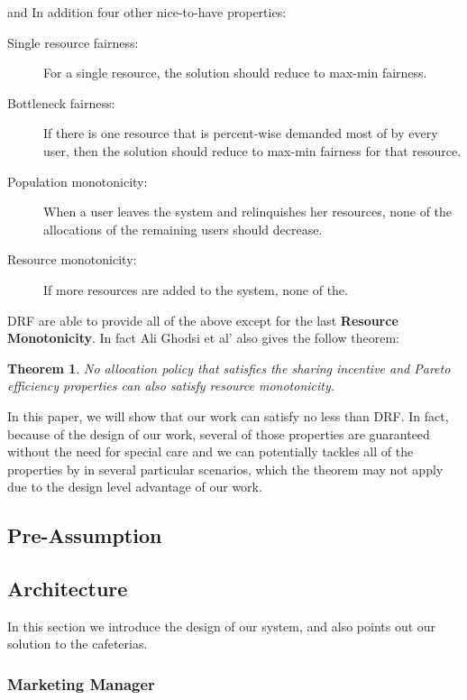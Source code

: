 \documentclass[a4paper,11pt,twocolumn]{article}
\begin{document}
and In addition  four
other nice-to-have properties:

\begin{description}

\item 
[Single resource fairness:] 
For a single resource, the
solution should reduce to max-min fairness.
\item 
[Bottleneck fairness:]
 If there is one resource that is
percent-wise demanded most of by every user, then
the solution should reduce to max-min fairness for
that resource.
\item 
[Population monotonicity:]
When a user leaves the
system and relinquishes her resources, none of the
allocations of the remaining users should decrease.
\item 
[Resource monotonicity:]
If more resources are added
to the system, none of the.
\end{description}

DRF are able to provide all of the above except for the last \textbf{Resource Monotonicity}.
In fact Ali Ghodsi et al' also gives the follow theorem:
\newtheorem{thm}{Theorem}
\begin{thm}
 No allocation policy that satisfies the sharing incentive and Pareto efficiency properties can also
satisfy resource monotonicity.
\end{thm}

In this paper, we will show that our work can satisfy no less than DRF. In fact, because of the design of our work, several of 
those properties are guaranteed without the need for special care and we can   potentially tackles all of the
properties by in several particular scenarios, which the theorem may not apply due to the design level advantage of our work.



\subsection{Pre-Assumption}


\subsection{Architecture}
In this section we introduce the design of our system, and also points out our solution to the cafeterias.


\subsubsection{Marketing Manager}
\end{document}
